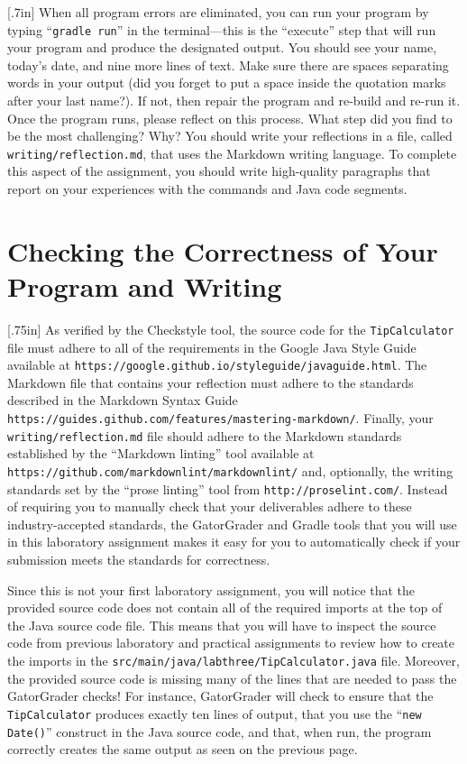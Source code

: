 \documentclass[11pt]{article}
\newcommand{\mainprogram}{\lstinline{TipCalculator}}
\newcommand{\mainprogramsource}{\lstinline{src/main/java/labthree/TipCalculator.java}}
\newcommand{\reflection}{\lstinline{writing/reflection.md}}
\newcommand{\gradlerun}{\command{gradle run}}
\newcommand{\command}[1]{``\lstinline{#1}''}
\newcommand{\url}[1]{\lstinline{#1}}
\newcommand{\step}[1]{``{#1}''}
\newcommand{\resource}[1]{\null\hfill\LARGE{\faLink{}}\newline\scriptsize{\em{#1}}}
\newcommand{\think}[1]{\null\hfill\LARGE{\faCogs{}}\newline\scriptsize{\em{#1}}}
\begin{document}
\marginnote{\think{Reflect on challenges}}[.7in] When all program errors are
eliminated, you can run your program by typing \gradlerun{} in the
terminal---this is the ``execute'' step that will run your program and produce
the designated output. You should see your name, today's date, and nine more
lines of text. Make sure there are spaces separating words in your output (did
you forget to put a space inside the quotation marks after your last name?). If
not, then repair the program and re-build and re-run it. Once the program runs,
please reflect on this process. What step did you find to be the most
challenging? Why? You should write your reflections in a file, called
\reflection{}, that uses the Markdown writing language. To complete this aspect
of the assignment, you should write high-quality paragraphs that report on your
experiences with the commands and Java code segments.

\section*{Checking the Correctness of Your Program and Writing}

\marginnote{\resource{Study style guides}}[.75in] As verified by the Checkstyle
tool, the source code for the \mainprogram{} file must adhere to all of the
requirements in the Google Java Style Guide available at
\url{https://google.github.io/styleguide/javaguide.html}. The Markdown file
that contains your reflection must adhere to the standards described in the
Markdown Syntax Guide
\url{https://guides.github.com/features/mastering-markdown/}. Finally, your
\reflection{} file should adhere to the Markdown standards established by the
\step{Markdown linting} tool available at
\url{https://github.com/markdownlint/markdownlint/} and, optionally, the
writing standards set by the \step{prose linting} tool from
\url{http://proselint.com/}. Instead of requiring you to manually check that
your deliverables adhere to these industry-accepted standards, the GatorGrader
and Gradle tools that you will use in this laboratory assignment makes it easy
for you to automatically check if your submission meets the standards for
correctness.

Since this is not your first laboratory assignment, you will notice that the
provided source code does not contain all of the required imports at the top of
the Java source code file. This means that you will have to inspect the source
code from previous laboratory and practical assignments to review how to create
the imports in the \mainprogramsource{} file. Moreover, the provided source
code is missing many of the lines that are needed to pass the GatorGrader
checks! For instance, GatorGrader will check to ensure that the \mainprogram{}
produces exactly ten lines of output, that you use the \command{new Date()}
construct in the Java source code, and that, when run, the program correctly
creates the same output as seen on the previous page.
\end{document}
